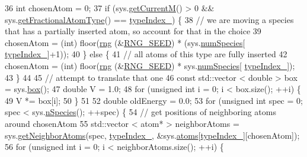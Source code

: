 \begin{DoxyCode}
36     \textcolor{keywordtype}{int} chosenAtom = 0;
37     \textcolor{keywordflow}{if} (sys.\hyperlink{classsim_system_a299fe4372e610b554eaaf5f5957b2dbc}{getCurrentM}() > 0 && sys.\hyperlink{classsim_system_a0500a9e84eecfbde7a98cf8a34f719d5}{getFractionalAtomType}() == 
      \hyperlink{classmc_move_acb731965547b0326ef318ec96da8b46a}{typeIndex\_}) \{
38         \textcolor{comment}{// we are moving a species that has a partially inserted atom, so account for that in the choice}
39         chosenAtom = (int) floor(\hyperlink{utilities_8cpp_a0f9542af4b475ac79cb679d7a8d14db0}{rng} (&\hyperlink{global_8h_a3f4e4ea24d5a5c66feae55d1f329c884}{RNG\_SEED}) * (sys.\hyperlink{classsim_system_a9eea865e6dc1cff377b1e79c4d9c23f0}{numSpecies}[
      \hyperlink{classmc_move_acb731965547b0326ef318ec96da8b46a}{typeIndex\_}]+1));
40     \} \textcolor{keywordflow}{else} \{
41         \textcolor{comment}{// all atoms of this type are fully inserted}
42         chosenAtom = (int) floor(\hyperlink{utilities_8cpp_a0f9542af4b475ac79cb679d7a8d14db0}{rng} (&\hyperlink{global_8h_a3f4e4ea24d5a5c66feae55d1f329c884}{RNG\_SEED}) * sys.\hyperlink{classsim_system_a9eea865e6dc1cff377b1e79c4d9c23f0}{numSpecies}[
      \hyperlink{classmc_move_acb731965547b0326ef318ec96da8b46a}{typeIndex\_}]);
43     \}
44 
45     \textcolor{comment}{// attempt to translate that one}
46     \textcolor{keyword}{const} std::vector < double > box = sys.\hyperlink{classsim_system_a8bff9dfb95b1b09a0fab2c1c485ade07}{box}();
47         \textcolor{keywordtype}{double} V = 1.0;
48         \textcolor{keywordflow}{for} (\textcolor{keywordtype}{unsigned} \textcolor{keywordtype}{int} i = 0; i < box.size(); ++i) \{
49             V *= box[i];
50         \}
51 
52         \textcolor{keywordtype}{double} oldEnergy = 0.0;
53         \textcolor{keywordflow}{for} (\textcolor{keywordtype}{unsigned} \textcolor{keywordtype}{int} spec = 0; spec < sys.\hyperlink{classsim_system_ab5e2e9b6204de15520302fe1d51688dd}{nSpecies}(); ++spec) \{
54             \textcolor{comment}{// get positions of neighboring atoms around chosenAtom}
55             std::vector < atom* > neighborAtoms = sys.\hyperlink{classsim_system_a9b3aeefa22c3b50b5913df6eea753bc6}{getNeighborAtoms}(spec, 
      \hyperlink{classmc_move_acb731965547b0326ef318ec96da8b46a}{typeIndex\_}, &sys.\hyperlink{classsim_system_a90421b19082f7fb8fc23b7264b1161e4}{atoms}[\hyperlink{classmc_move_acb731965547b0326ef318ec96da8b46a}{typeIndex\_}][chosenAtom]);
56             \textcolor{keywordflow}{for} (\textcolor{keywordtype}{unsigned} \textcolor{keywordtype}{int} i = 0; i < neighborAtoms.size(); ++i) \{

\end{DoxyCode}
